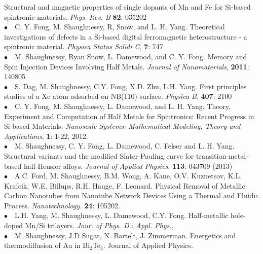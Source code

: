 \documentclass[11pt, a4paper]{article}
\newcommand{\years}[1]{\marginnote{\scriptsize #1}}
\begin{document}
{{{Structural and magnetic properties of single dopants of Mn and Fe for Si-based spintronic materials.} \emph{Phys. Rev. B} \textbf{82}: 035202 \\
\years{    }$\bullet$\ \   C. Y. Fong, M. Shaughnessy, R, Snow, and L. H. Yang. %
{Theoretical investigations of defects in a Si-based digital ferromagnetic heterostructure - a spintronic material.} \emph{Physica Status Solidi C}, \textbf{7}: 747\\
\years{2011}$\bullet$\ \   M. Shaughnessy, Ryan Snow, L. Damewood, and C. Y. Fong. %
{Memory and Spin Injection Devices Involving Half Metals.} \emph{Journal of Nanomaterials}, \textbf{2011}: 140805\\
\years{2012}$\bullet$\ \   S. Dag, M. Shaughnessy, C.Y. Fong, X.D. Zhu, L.H. Yang. %
{First principles studies of a Xe atom adsorbed on NB(110) surface.} \emph{Physica B}, \textbf{407}: 2100 \\
\years{    }$\bullet$\ \   C. Y. Fong, M. Shaughnessy, L. Damewood, and L. H. Yang. %
{Theory, Experiment and Computation of Half Metals for Spintronics: Recent Progress in Si-based Materials.} \emph{Nanoscale Systems: Mathematical Modeling, Theory and Applications},  \textbf{1}: 1-22,  2012. \\
\years{2013}$\bullet$\ \   M. Shaughnessy, C. Y. Fong, L. Damewood, C. Felser and L. H. Yang. %
{Structural variants and the modified Slater-Pauling curve for transition-metal-based half-Heusler alloys.} \emph{Journal of Applied Physics}, \textbf{113}: 043709 (2013) \\
\years{    } $\bullet$\ \   A.C. Ford, M. Shaughnessy, B.M. Wong, A. Kane, O.V. Kuznetsov, K.L. Krafcik, W.E. Billups, R.H. Hauge, F. Leonard. %
{Physical Removal of Metallic Carbon Nanotubes from Nanotube Network Devices Using a Thermal and Fluidic Process.} \emph{Nanotechnology.} \textbf{24}: 105202. \\
\years{    }$\bullet$\ \    L.H. Yang, M. Shaughnessy, L. Damewood, C.Y. Fong. %
{Half-metallic hole-doped Mn/Si trilayers.} 
\emph{Jour. of Phys. D.: Appl. Phys.}, \\
\years{2014}$\bullet$\ \   M. Shaughnessy, J.D Sugar, N. Bartelt, J. Zimmerman. {Energetics and thermodiffusion of Au in Bi$_2$Te$_3$.} Journal of Applied Physics.
}}
\end{document}
